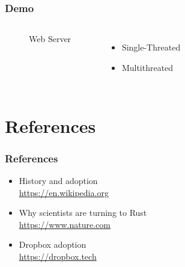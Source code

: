\documentclass{beamer}
\begin{document}
\begin{frame}
\frametitle{Demo}

\begin{columns}[c] %

  \begin{figure}
    \centering
  \caption{Web Server}
  \end{figure}

\begin{itemize}
\item Single-Threated
\item Multithreated
\end{itemize}

\end{columns}

\end{frame}

\section{References}

\begin{frame}
\frametitle{References}
\begin{itemize}
\item History and adoption\\
\href{https://en.wikipedia.org/wiki/Rust_(programming_language)}{https://en.wikipedia.org}
\item Why scientists are turning to Rust\\
\href{https://www.nature.com/articles/d41586-020-03382-2}{https://www.nature.com}
\item Dropbox adoption\\
\href{https://dropbox.tech/infrastructure/rewriting-the-heart-of-our-sync-engine}{https://dropbox.tech}
\end{itemize}
\end{frame}
\end{document}
